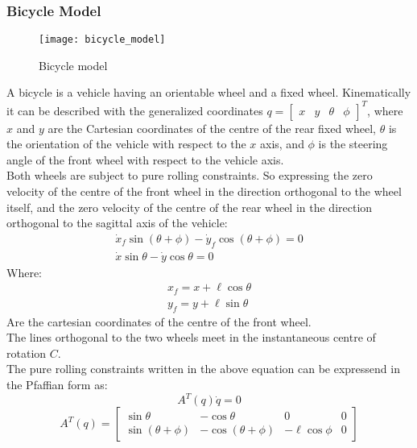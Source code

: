\subsubsection{Bicycle Model}
\begin{figure}[h!]
	\centering
	\texttt{[image: bicycle\_model]}
	\caption{Bicycle model}
\end{figure}
A bicycle is a vehicle having an orientable wheel and a fixed wheel. Kinematically it can be described with the generalized coordinates $q = \left[\begin{matrix}x&y&\theta&\phi\end{matrix}\right]^T$, where $x$ and $y$ are the Cartesian coordinates of the centre of the rear fixed wheel, $\theta$ is the orientation of the vehicle with respect to the $x$ axis, and $\phi$ is the steering angle of the front wheel with respect to the vehicle axis.\\
Both wheels are subject to pure rolling constraints. So expressing the zero velocity of the centre of the front wheel in the direction orthogonal to the wheel itself, and the zero velocity of the centre of the rear wheel in the direction orthogonal to the sagittal axis of the vehicle:
\begin{equation}
\begin{split}
\dot{x}_f\sin \left( \theta+\phi \right)-\dot{y}_f \cos\left(\theta+\phi\right)=0\\
\dot{x}\sin\theta-\dot{y}\cos\theta=0
\end{split}
\end{equation}
Where:
\begin{align*}
x_f=x+\ell\cos\theta \\
y_f=y+\ell\sin\theta
\end{align*}
Are the cartesian coordinates of the centre of the front wheel.\\
The lines orthogonal to the two wheels meet in the instantaneous centre of rotation $C$.\\
The pure rolling constraints written in the above equation can be expressend in the Pfaffian form as:
\begin{equation*} 
A^T \left( q \right)\dot{q} =0  
\end{equation*}
\begin{equation}
A^T \left( q \right) = \left[ 
\begin{matrix}
\sin\theta & -\cos\theta & 0 & 0 \\
\sin\left(\theta+\phi \right) & -\cos\left(\theta+\phi \right) & -\ell\cos\phi & 0
\end{matrix}
\right]
\end{equation}
